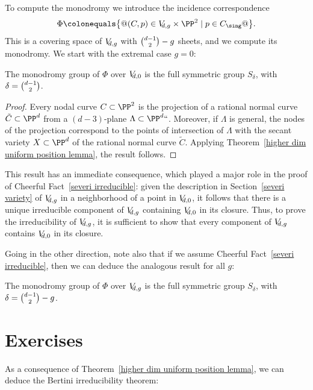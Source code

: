 To compute the monodromy we introduce the incidence correspondence
$$
\Phi \colonequals \big\{@(C, p) \in \VD{g} \times \PP^2 \mid p \in C_{\sing}
@\big\}.
$$
This is a
covering space of $\VD{g}$
with $\tbinom{d-1}{2} - \nobreak g$ sheets, 
and we compute its
monodromy. We start with the extremal case $g = 0$:

\begin{proposition}
The monodromy group of $\Phi$ over $\VD{0}$ is the full symmetric group
\label{plane curve nodes}
$S_\delta$, with $\delta = \tbinom{d-1}{2}$.
\end{proposition}

\begin{proof}
Every 
nodal curve
%
$C \subset \PP^2$ is the projection of a
rational normal curve
%
$\tilde C \subset \PP^d$ from a $(d-3)$-plane
$\Lambda \subset \PP^d` `$. Moreover, if $\Lambda$ is general,  the nodes
of the projection correspond to the points of intersection of $\Lambda$
with the  
secant variety
%
$X \subset \PP^d$ of the rational normal curve
$\tilde C$. Applying Theorem~\ref{higher dim uniform position lemma},
the result follows.
\end{proof}

This result has an immediate consequence, which played a major role in the
proof of Cheerful Fact~\ref{severi irreducible}: given the description in
Section~\ref{severi variety} of $\VD{g}$ in a neighborhood of a point
in $\VD{0}$, it follows that there is a unique irreducible component
of $\VD{g}$ containing $\VD{0}$ in its closure. Thus, to prove the
irreducibility of $\VD{g}$, it is sufficient to show that every component
of $\VD{g}$ contains $\VD{0}$ in its closure.

Going in the other direction, note also that if we assume Cheerful
Fact~\ref{severi irreducible}, then we can deduce the analogous result
for all $g$:


\begin{proposition}
The monodromy group of $\Phi$ over $\VD{g}$ is the full symmetric group
$S_\delta$, with $\delta = \tbinom{d-1}{2} - g$.
\end{proposition}



\section{Exercises}

As a consequence of Theorem~\ref{higher dim uniform position lemma},
we can deduce the 
Bertini irreducibility theorem:
%

